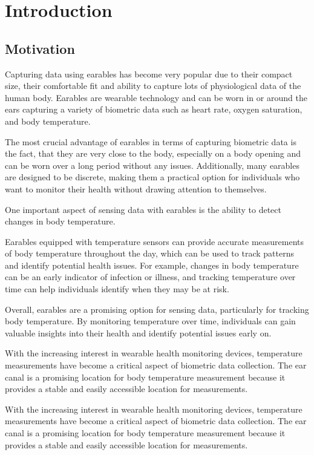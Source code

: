 
\chapter{Introduction}
\label{ch:Introduction}

\section{Motivation}
Capturing data using earables has become very popular due to their compact size, their comfortable fit and ability to capture lots of physiological data of the human body. 
Earables are wearable technology and can be worn in or around the ears capturing a variety of biometric data such as heart rate, oxygen saturation, and body temperature.

The most crucial advantage of earables in terms of capturing biometric data is the fact, that they are very close to the body, especially on a body opening and can be worn over a long period without any issues. 
Additionally, many earables are designed to be discrete, making them a practical option for individuals who want to monitor their health without drawing attention to themselves.

One important aspect of sensing data with earables is the ability to detect changes in body temperature. 

Earables equipped with temperature sensors can provide accurate measurements of body temperature throughout the day, which can be used to track patterns and identify potential health issues. 
For example, changes in body temperature can be an early indicator of infection or illness, and tracking temperature over time can help individuals identify when they may be at risk.

Overall, earables are a promising option for sensing data, particularly for tracking body temperature. 
By monitoring temperature over time, individuals can gain valuable insights into their health and identify potential issues early on.

With the increasing interest in wearable health monitoring devices, temperature measurements have become a critical aspect of biometric data collection. The ear canal is a promising location for body temperature measurement because it provides a stable and easily accessible location for measurements.

With the increasing interest in wearable health monitoring devices, temperature measurements have become a critical aspect of biometric data collection. The ear canal is a promising location for body temperature measurement because it provides a stable and easily accessible location for measurements. %

